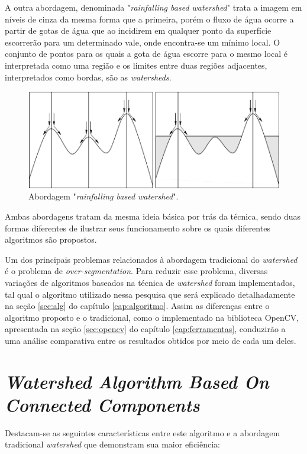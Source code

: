 A outra abordagem, denominada "\textit{rainfalling based watershed}" trata a imagem em níveis de cinza da mesma forma que a primeira, porém o fluxo de água ocorre a partir de gotas de água que ao incidirem em qualquer ponto da superfície escorrerão para um determinado vale, onde encontra-se um mínimo local. O conjunto de pontos para os quais a gota de água escorre para o mesmo local é interpretada como uma região e os limites entre duas regiões adjacentes,  interpretados como bordas, são as \textit{watersheds}.

	\begin{figure}[!htb]
       \begin{center}  
          \includegraphics[width=0.8\columnwidth]{img/abordagem_rainfalling.jpg}
           \caption{\label{fig:abordagem_rainfalling}Abordagem "\textit{rainfalling based watershed}".\cite{ruparelia2012implementation}}
       \end{center}
   \end{figure} 
	

Ambas abordagens tratam da mesma ideia básica por trás da técnica, sendo duas formas diferentes de ilustrar seus funcionamento sobre os quais diferentes algoritmos são propostos.

Um dos principais problemas relacionados à abordagem tradicional do \textit{watershed} é o problema de \textit{over-segmentation}. Para reduzir esse problema, diversas variações de algoritmos baseados na técnica de \textit{watershed} foram implementados, tal qual o algoritmo utilizado nessa pesquisa que será explicado detalhadamente na seção \ref{sec:alg} do capítulo \ref{cap:algoritmo}. Assim as diferenças entre o algoritmo proposto e o tradicional, como o implementado na biblioteca OpenCV, apresentada na seção \ref{sec:opencv} do capítulo \ref{cap:ferramentas}, conduzirão a uma análise comparativa entre os resultados obtidos por meio de cada um deles.

\section{\textit{Watershed Algorithm Based On Connected Components}}
Destacam-se as seguintes características entre este algoritmo e a abordagem tradicional \textit{watershed} que demonstram sua maior eficiência:

